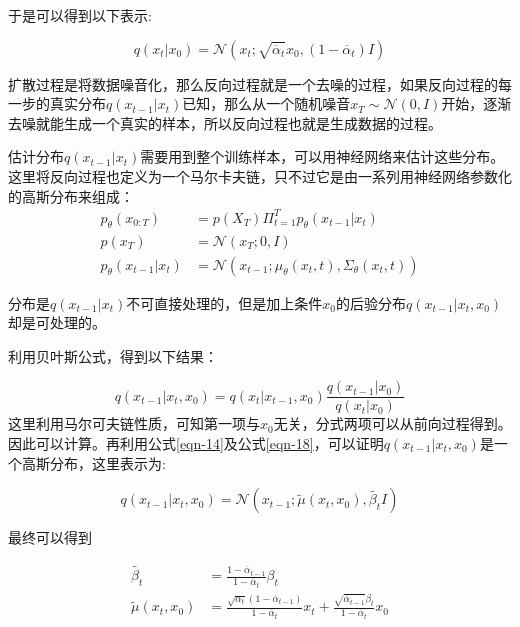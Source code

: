 于是可以得到以下表示:

\begin{equation}\label{eqn-14}
      q(x_t|x_{0})=\mathcal{N}(x_t;\sqrt{\overline{\alpha}_t}x_{0},(1-\overline{\alpha}_t)I)
\end{equation}

扩散过程是将数据噪音化，那么反向过程就是一个去噪的过程，如果反向过程的每一步的真实分布$q(x_{t-1}|x_t)$已知，那么从一个随机噪音$x_T \sim \mathcal{N}(0,I)$开始，逐渐去噪就能生成一个真实的样本，所以反向过程也就是生成数据的过程。

估计分布$q(x_{t-1}|x_t)$需要用到整个训练样本，可以用神经网络来估计这些分布。这里将反向过程也定义为一个马尔卡夫链，只不过它是由一系列用神经网络参数化的高斯分布来组成：
\begin{align}
      p_{\theta}(x_{0:T}) &= p(X_T)\Pi^T_{t=1}{p_{\theta}(x_{t-1}|x_t)} \label{eqn-16}\\
      p(x_T) &= \mathcal{N}(x_T;0,I)\label{eqn-16}\\
      p_{\theta}(x_{t-1}|x_t) &= \mathcal{N}(x_{t-1};\mu_{\theta}(x_t,t),\Sigma_{\theta}(x_t,t))\label{eqn-17}
\end{align}

分布是$q(x_{t-1}|x_t)$不可直接处理的，但是加上条件$x_0$的后验分布$q(x_{t-1}|x_t,x_0)$却是可处理的。

利用贝叶斯公式，得到以下结果：

\begin{equation}\label{eqn-18}
      q(x_{t-1}|x_t,x_0) = q(x_{t}|x_{t-1},x_0)\frac{q(x_{t-1}|x_0)}{q(x_{t}|x_0)}
\end{equation}
这里利用马尔可夫链性质，可知第一项与$x_0$无关，分式两项可以从前向过程得到。因此可以计算。再利用公式\eqref{eqn-14}及公式\eqref{eqn-18}，可以证明$q(x_{t-1}|x_t,x_0)$是一个高斯分布，这里表示为:

\begin{equation}\label{eqn-19}
      q(x_{t-1}|x_t,x_0) = \mathcal{N}(x_{t-1};\widetilde{\mu}(x_t,x_0),\widetilde{\beta_t}I)
\end{equation}

最终可以得到

\begin{align}
      \widetilde{\beta_t} &= \frac{1 - \overline{\alpha}_{t-1}}{1 - \overline{\alpha}_{t}}\beta_t \label{eqn-20}\\
      \widetilde{\mu}(x_t,x_0) &= \frac{\sqrt{\alpha_t}(1- \overline{\alpha}_{t-1})}{1- \overline{\alpha}_{t}}x_t + \frac{\sqrt{\overline{\alpha}_{t-1}}\beta_t}{1- \overline{\alpha}_{t}}x_0 \label{eqn-21}
\end{align}

